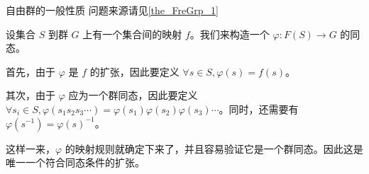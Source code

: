 \begin{example}{自由群的一般性质}\label{ex_GroupP_4}
问题来源请见\autoref{the_FreGrp_1}~

设集合 $S$ 到群 $G$ 上有一个集合间的映射 $f$。我们来构造一个 $\varphi: F(S)\rightarrow G$ 的同态。

首先，由于 $\varphi$ 是 $f$ 的扩张，因此要定义 $\forall s\in S, \varphi(s)=f(s)$。

其次，由于 $\varphi$ 应为一个群同态，因此要定义 $\forall s_i\in S, \varphi({s_1s_2s_3\cdots})=\varphi(s_1)\varphi(s_2)\varphi(s_3)\cdots$。同时，还需要有 $\varphi(s^{-1})=\varphi(s)^{-1}$。

这样一来，$\varphi$ 的映射规则就确定下来了，并且容易验证它是一个群同态。因此这是唯一一个符合同态条件的扩张。


\end{example}
